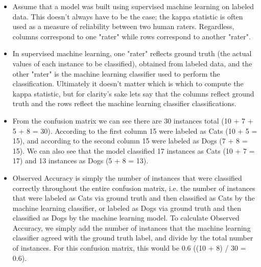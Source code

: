 \documentclass[caret-main.tex]{subfiles}
\begin{document}
\begin{itemize}
\item Assume that a model was built using supervised machine learning on labeled data. This doesn't always have to be the case; the kappa statistic is often used as a measure of reliability between two human raters. Regardless, columns correspond to one "rater" while rows correspond to another "rater". 

\item In supervised machine learning, one "rater" reflects ground truth (the actual values of each instance to be classified), obtained from labeled data, and the other "rater" is the machine learning classifier used to perform the classification. Ultimately it doesn't matter which is which to compute the kappa statistic, but for clarity's sake lets say that the columns reflect ground truth and the rows reflect the machine learning classifier classifications.

\item From the confusion matrix we can see there are 30 instances total (10 + 7 + 5 + 8 = 30). According to the first column 15 were labeled as Cats (10 + 5 = 15), and according to the second column 15 were labeled as Dogs (7 + 8 = 15). We can also see that the model classified 17 instances as Cats (10 + 7 = 17) and 13 instances as Dogs (5 + 8 = 13).

\item Observed Accuracy is simply the number of instances that were classified correctly throughout the entire confusion matrix, i.e. the number of instances that were labeled as Cats via ground truth and then classified as Cats by the machine learning classifier, or labeled as Dogs via ground truth and then classified as Dogs by the machine learning model. To calculate Observed Accuracy, we simply add the number of instances that the machine learning classifier agreed with the ground truth label, and divide by the total number of instances. For this confusion matrix, this would be 0.6 ((10 + 8) / 30 = 0.6).


\end{itemize}
\end{document}
